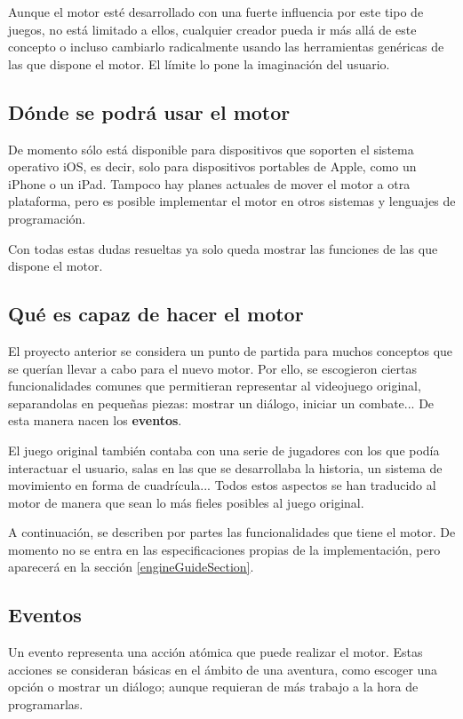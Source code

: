 Aunque el motor esté desarrollado con una fuerte influencia por este tipo de juegos, no está limitado a ellos, cualquier creador pueda ir más allá de este concepto o incluso cambiarlo radicalmente usando las herramientas genéricas de las que dispone el motor. El límite lo pone la imaginación del usuario.

\subsection{Dónde se podrá usar el motor}
De momento sólo está disponible para dispositivos que soporten el sistema operativo iOS, es decir, solo para dispositivos portables de Apple, como un iPhone o un iPad.
Tampoco hay planes actuales de mover el motor a otra plataforma, pero es posible implementar el motor en otros sistemas y lenguajes de programación.

Con todas estas dudas resueltas ya solo queda mostrar las funciones de las que dispone el motor.

\subsection{Qué es capaz de hacer el motor}

El proyecto anterior se considera un punto de partida para muchos conceptos que se querían llevar a cabo para el nuevo motor. Por ello, se escogieron ciertas funcionalidades comunes que permitieran representar al videojuego original, separandolas en pequeñas piezas: mostrar un diálogo, iniciar un combate...
De esta manera nacen los \textbf{eventos}.

El juego original también contaba con una serie de jugadores con los que podía interactuar el usuario, salas en las que se desarrollaba la historia, un sistema de movimiento en forma de cuadrícula... Todos estos aspectos se han traducido al motor de manera que sean lo más fieles posibles al juego original.

A continuación, se describen por partes las funcionalidades que tiene el motor. De momento no se entra en las especificaciones propias de la implementación, pero aparecerá en la sección \ref{engineGuideSection}.

\subsection{Eventos}

Un evento representa una acción atómica que puede realizar el motor. Estas acciones se consideran básicas en el ámbito de una aventura, como escoger una opción o mostrar un diálogo; aunque requieran de más trabajo a la hora de programarlas.

